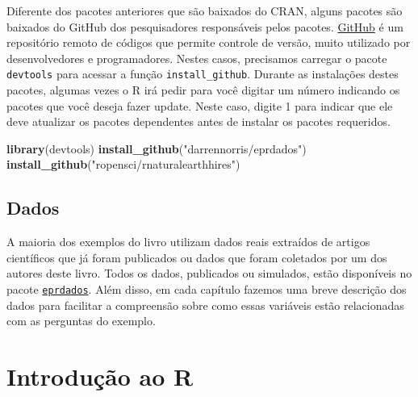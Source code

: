 \documentclass[
]{article}
\newenvironment{Shaded}{\begin{snugshade}}{\end{snugshade}}
\newcommand{\AttributeTok}[1]{\textcolor[rgb]{0.13,0.29,0.53}{#1}}
\newcommand{\ConstantTok}[1]{\textcolor[rgb]{0.56,0.35,0.01}{#1}}
\newcommand{\FunctionTok}[1]{\textcolor[rgb]{0.13,0.29,0.53}{\textbf{#1}}}
\newcommand{\NormalTok}[1]{#1}
\newcommand{\StringTok}[1]{\textcolor[rgb]{0.31,0.60,0.02}{#1}}
\begin{document}
\begin{Shaded}
\begin{Highlighting}[]
}\StringTok{"TPD"}\NormalTok{, }\StringTok{"vcd"}\NormalTok{, }\StringTok{"vegan"}\NormalTok{, }\StringTok{"viridis"}\NormalTok{, }\StringTok{"visdat"}\NormalTok{, }\StringTok{"mvabund"}\NormalTok{, }\StringTok{"rdist"}\NormalTok{, }\StringTok{"udunits2"}\NormalTok{), }\AttributeTok{dependencies =} \ConstantTok{TRUE}\NormalTok{)}
\end{Highlighting}
\end{Shaded}

Diferente dos pacotes anteriores que são baixados do CRAN, alguns pacotes são baixados do GitHub dos pesquisadores responsáveis pelos pacotes. \href{https://github.com/}{GitHub} é um repositório remoto de códigos que permite controle de versão, muito utilizado por desenvolvedores e programadores. Nestes casos, precisamos carregar o pacote \texttt{devtools} para acessar a função \texttt{install\_github}. Durante as instalações destes pacotes, algumas vezes o R irá pedir para você digitar um número indicando os pacotes que você deseja fazer update. Neste caso, digite 1 para indicar que ele deve atualizar os pacotes dependentes antes de instalar os pacotes requeridos.

\begin{Shaded}
\begin{Highlighting}[]
\FunctionTok{library}\NormalTok{(devtools) }
\FunctionTok{install\_github}\NormalTok{(}\StringTok{"darrennorris/eprdados"}\NormalTok{)}
\FunctionTok{install\_github}\NormalTok{(}\StringTok{"ropensci/rnaturalearthhires"}\NormalTok{)}
\end{Highlighting}
\end{Shaded}

\hypertarget{dados-3}{%
\subsection{Dados}\label{dados-3}}

A maioria dos exemplos do livro utilizam dados reais extraídos de artigos científicos que já foram publicados ou dados que foram coletados por um dos autores deste livro. Todos os dados, publicados ou simulados, estão disponíveis no pacote \href{https://darrennorris.github.io/eprdados/}{\texttt{eprdados}}. Além disso, em cada capítulo fazemos uma breve descrição dos dados para facilitar a compreensão sobre como essas variáveis estão relacionadas com as perguntas do exemplo.

\newpage{}

\hypertarget{cap21}{%
\section{Introdução ao R}\label{cap21}}
\end{document}

